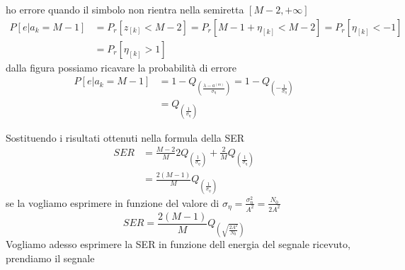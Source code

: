 \begin{enumerate}
{\begin{figure}[H]
                    \end{figure}
                    ho errore quando il simbolo non rientra nella semiretta $[M-2,+\infty]$
                    \begin{align}
                        P[e|a_k=M-1] &= P_r[z_{[k]}<M-2] = P_r[M-1+\eta_{[k]}<M-2] = P_r[\eta_{[k]}<-1] \nonumber \\
                                     &= P_r[\eta_{[k]}>1]\nonumber
                    \end{align}
                    dalla figura possiamo ricavare la probabilità di errore 
                    \begin{align}
                        P[e|a_k=M-1] &= 1-Q_{\displaystyle \left(\frac{\lambda-a^{(m)}}{\sigma_\eta}\right)} = 1-Q_{\displaystyle\left(-\frac{1}{\sigma_\eta}\right)} \nonumber \\
                                     &= Q_{\displaystyle\left(\frac{1}{\sigma_\eta}\right)} \nonumber
                    \end{align}
                }
            \end{enumerate}
            Sostituendo i risultati ottenuti nella formula della SER
            \begin{align}
                SER &= \frac{M-2}{M}2Q_{\displaystyle\left(\frac{1}{\sigma_\eta}\right)}+ \frac{2}{M}Q_{\displaystyle\left(\frac{1}{\sigma_\eta}\right)} \nonumber \\
                    &= \frac{2(M-1)}{M} Q_{\displaystyle\left(\frac{1}{\sigma_\eta}\right)} \nonumber
            \end{align}
            se la vogliamo esprimere in funzione del valore di $\sigma_\eta= \frac{\sigma_n^2}{A^2} = \frac{N_0}{2A^2}$
            \[
                SER = \frac{2(M-1)}{M} Q_{\displaystyle\left(\sqrt{\frac{2A^2}{N_0}}\right)} 
            \]
            Vogliamo adesso esprimere la SER in funzione dell energia del segnale ricevuto, prendiamo il segnale 
